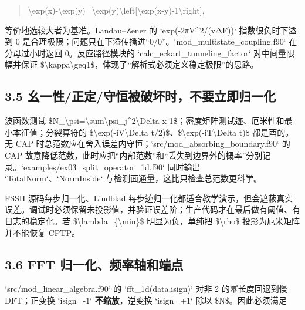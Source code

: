 \documentclass[UTF8,openany,11pt,fontset=fandol]{ctexbook}
\begin{document}
\begin{quote}
\textbackslash exp(x)-\textbackslash exp(y)=\textbackslash exp(y)\textbackslash left{[}\textbackslash exp(x-y)-1\textbackslash right{]},
\end{quote}

等价地选较大者为基准。Landau--Zener 的
`exp(-2πV\^{}2/(v\textbar ΔF\textbar))` 指数很负时下溢到 0
是合理极限；问题只在下溢传播进``0/0''。`mod\_multistate\_coupling.f90`
在分母过小时返回 0。反应路径模块的 `calc\_eckart\_tunneling\_factor`
对中间量限幅并保证
\$\textbackslash kappa\textbackslash geq1\$，体现了``解析式必须定义稳定极限''的思路。

\subsection{\texorpdfstring{\textbf{3.5
幺一性/正定/守恒被破坏时，不要立即归一化}}{3.5 幺一性/正定/守恒被破坏时，不要立即归一化}}\label{ux5e7aux4e00ux6027ux6b63ux5b9aux5b88ux6052ux88abux7834ux574fux65f6ux4e0dux8981ux7acbux5373ux5f52ux4e00ux5316}

波函数测试
\$N\_\textbackslash psi=\textbar\textbackslash sum\textbar\textbackslash psi\_j\textbar\^{}2\textbackslash Delta
x-1\textbar\$；密度矩阵测试迹、厄米性和最小本征值；分裂算符的
\$\textbackslash exp(-iV\textbackslash Delta
t/2)\$、\$\textbackslash exp(-iT\textbackslash Delta t)\$ 都是酉的。无
CAP 时总范数应在舍入误差内守恒；`src/mod\_absorbing\_boundary.f90` 的
CAP
故意降低范数，此时应把``内部范数''和``丢失到边界外的概率''分别记录。`examples/ex03\_split\_operator\_1d.f90`
同时输出 `TotalNorm`、`NormInside`
与检测面通量，这比只检查总范数更科学。

FSSH 源码每步归一化、Lindblad
每步迹归一化都适合教学演示，但会遮蔽真实误差。调试时必须保留未投影值，并验证误差阶；生产代码才在最后做有阈值、有日志的稳定化。若
\$\textbackslash lambda\_\{\textbackslash min\}\$ 明显为负，单纯把
\$\textbackslash rho\$ 投影为厄米矩阵并不能恢复 CPTP。

\subsection{\texorpdfstring{\textbf{3.6 FFT
归一化、频率轴和端点}}{3.6 FFT 归一化、频率轴和端点}}\label{fft-ux5f52ux4e00ux5316ux9891ux7387ux8f74ux548cux7aefux70b9}

`src/mod\_linear\_algebra.f90` 的 `fft\_1d(data,isign)` 对非 2
的幂长度回退到慢 DFT；正变换 `isign=-1` \textbf{不缩放}，逆变换
`isign=+1` 除以 \$N\$。因此必须满足
\end{document}
